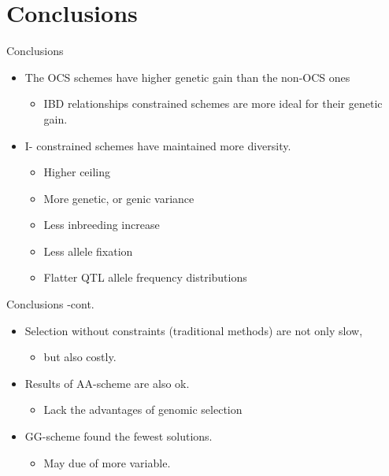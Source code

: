 \documentclass{beamer}
\begin{document}
\section{Conclusions}
\begin{frame}{Conclusions}
  \begin{itemize}
  \item The OCS schemes have higher genetic gain than the non-OCS ones
    \begin{itemize}
      \item IBD relationships constrained schemes are more ideal for their genetic gain.
    \end{itemize}
  \item I- constrained schemes have maintained more diversity.
    \begin{itemize}
    \item Higher ceiling
    \item More genetic, or genic variance
    \item Less inbreeding increase
    \item Less allele fixation
    \item Flatter QTL allele frequency distributions
    \end{itemize}
  \end{itemize}
\end{frame}

\begin{frame}{Conclusions -cont.}
  \begin{itemize}
    \item Selection without constraints (traditional methods) are not only slow,
      \begin{itemize}
        \item but also costly.
      \end{itemize}
    \item Results of AA-scheme are also ok.
      \begin{itemize}
        \item Lack the advantages of genomic selection
      \end{itemize}
    \item GG-scheme found the fewest solutions.
      \begin{itemize}
        \item May due of more variable.
      \end{itemize}
    \end{itemize}
\end{frame}
\end{document}
